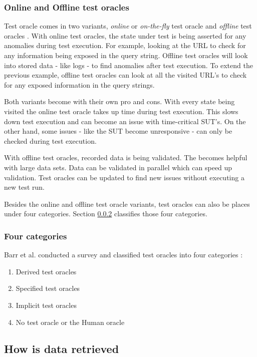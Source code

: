     \subsubsection{Online and Offline test oracles}
    Test oracle comes in two variants, \emph{online} or \emph{on-the-fly} test oracle and \emph{offline} test oracles \cite{VosAho2021}. With online test oracles, the state under test is being asserted for any anomalies during test execution. For example, looking at the URL to check for any information being exposed in the query string. Offline test oracles will look into stored data - like logs - to find anomalies after test execution. To extend the previous example, offline test oracles can look at all the visited URL's to check for any exposed information in the query strings. 

    Both variants become with their own pro and cons. With every state being visited the online test oracle takes up time during test execution. This slows down test execution and can become an issue with time-critical SUT's. On the other hand, some issues - like the SUT become unresponsive - can only be checked during test execution. 

    With offline test oracles, recorded data is being validated. The becomes helpful with large data sets. Data can be validated in parallel which can speed up validation. Test oracles can be updated to find new issues without executing a new test run. 

    Besides the online and offline test oracle variants, test oracles can also be places under four categories. Section \ref{to:four-cat} classifies those four categories.

    \subsubsection{Four categories} \label{to:four-cat}
    
    Barr et al. conducted a survey and classified test oracles into four categories \cite{barr2014oracle}:
    \begin{enumerate}
        \item Derived test oracles
        \item Specified test oracles
        \item Implicit test oracles
        \item No test oracle or the Human oracle
    \end{enumerate}
 

\subsection{How is data retrieved}

